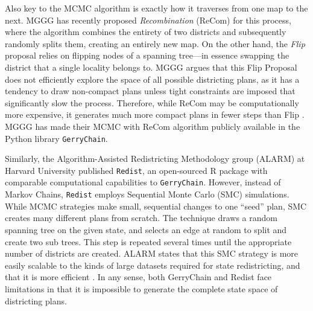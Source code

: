 \documentclass{article}
\begin{document}
\par
Also key to the MCMC algorithm is exactly how it traverses from one map to the next. MGGG has recently proposed \emph{Recombination} (ReCom) for this process, where the algorithm combines the entirety of two districts and subsequently randomly splits them, creating an entirely new map. On the other hand, the \emph{Flip} proposal relies on flipping nodes of a spanning tree—in essence swapping the district that a single locality belongs to.
MGGG argues that this Flip Proposal does not efficiently explore the space of all possible districting plans, as it has a tendency to draw non-compact plans unless tight constraints are imposed that significantly slow the process. Therefore, while ReCom may be computationally more expensive, it generates much more compact plans in fewer steps than Flip \cite{DBLP:journals/corr/abs-1911-05725}. MGGG has made their MCMC with ReCom algorithm publicly available in the Python library \lstinline{GerryChain}. 
\par
Similarly, the Algorithm-Assisted Redistricting Methodology group (ALARM) at Harvard University published \lstinline{Redist}, an open-sourced R package with comparable computational capabilities to \lstinline{GerryChain}. However, instead of Markov Chains, \lstinline{Redist} employs Sequential Monte Carlo (SMC) simulations. While MCMC strategies make small, sequential changes to one “seed” plan, SMC creates many different plans from scratch. The technique draws a random spanning tree on the given state, and selects an edge at random to split and create two sub trees. This step is repeated several times until the appropriate number of districts are created. ALARM states that this SMC strategy is more easily scalable to the kinds of large datasets required for state redistricting, and that it is more efficient \cite{mccartan2023sequential}. In any sense, both GerryChain and Redist face limitations in that it is impossible to generate the complete state space of districting plans. 
\end{document}
